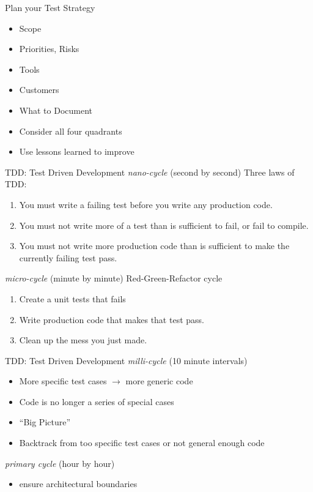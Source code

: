 \documentclass[10pt,t,a4paper]{beamer}
\begin{document}
\begin{frame}[label=sec-16]{Plan your Test Strategy}
\begin{itemize}
\item Scope
\item Priorities, Risks
\item Tools
\item Customers
\item What to Document
\item Consider all four quadrants
\item Use lessons learned to improve
\end{itemize}
\end{frame}
\begin{frame}[label=sec-17]{TDD: Test Driven Development}
\emph{nano-cycle} (second by second)
Three laws of TDD:
\begin{enumerate}
\item You must write a failing test before you write any production code.
\item You must not write more of a test than is sufficient to fail, or fail to compile.
\item You must not write more production code than is sufficient to make the currently failing test pass.
\end{enumerate}

\emph{micro-cycle} (minute by minute)
Red-Green-Refactor cycle

\begin{enumerate}
\item Create a unit tests that fails
\item Write production code that makes that test pass.
\item Clean up the mess you just made.
\end{enumerate}
\end{frame}
\begin{frame}[label=sec-18]{TDD: Test Driven Development}
\emph{milli-cycle} (10 minute intervals)
\begin{itemize}
\item More specific test cases $\rightarrow$ more generic code
\item Code is no longer a series of special cases
\item ``Big Picture''
\item Backtrack from too specific test cases or not general enough code
\end{itemize}

\emph{primary cycle} (hour by hour)
\begin{itemize}
\item ensure architectural boundaries
\end{itemize}
\end{frame}
\end{document}
